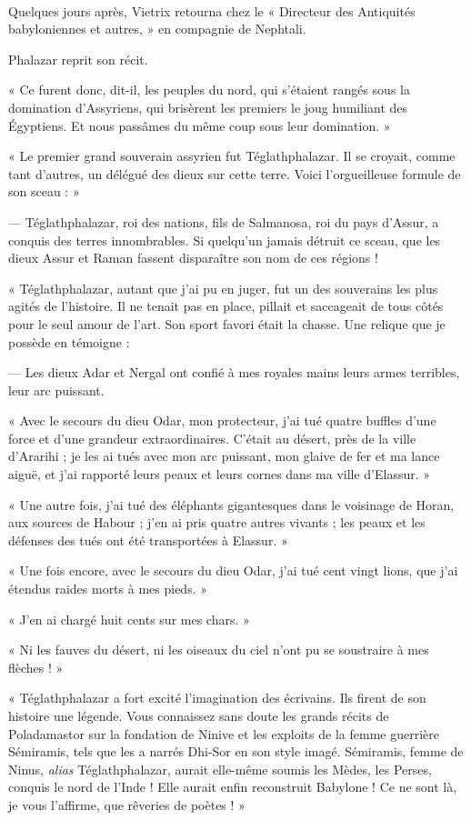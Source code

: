 \documentclass[a4paper, 11pt, oneside, polutonikogreek, french]{article}
\begin{document}
\paragraph{}
Quelques jours après, Vietrix retourna chez le « Directeur des Antiquités babyloniennes et autres, » en compagnie de Nephtali.

Phalazar reprit son récit.

« Ce furent donc, dit-il, les peuples du nord, qui s'étaient rangés sous la domination d'Assyriens, qui brisèrent les premiers le joug humiliant des Égyptiens. Et nous passâmes du même coup sous leur domination. »

« Le premier grand souverain assyrien fut Téglathphalazar. Il se croyait, comme tant d'autres, un délégué des dieux sur cette terre. Voici l'orgueilleuse formule de son sceau : »

--- Téglathphalazar, roi des nations, fils de Salmanosa, roi du pays d'Assur, a conquis des terres innombrables. Si quelqu'un jamais détruit ce sceau, que les dieux Assur et Raman fassent disparaître son nom de ces régions !

« Téglathphalazar, autant que j'ai pu en juger, fut un des souverains les plus agités de l'histoire. Il ne tenait pas en place, pillait et saccageait de tous côtés pour le seul amour de l'art. Son sport favori était la chasse. Une relique que je possède en témoigne :

--- Les dieux Adar et Nergal ont confié à mes royales mains leurs armes terribles, leur arc puissant.

« Avec le secours du dieu Odar, mon protecteur, j'ai tué quatre buffles d'une force et d'une grandeur extraordinaires. C'était au désert, près de la ville d'Ararihi ; je les ai tués avec mon arc puissant, mon glaive de fer et ma lance aiguë, et j'ai rapporté leurs peaux et leurs cornes dans ma ville d'Elassur. »

« Une autre fois, j'ai tué des éléphants gigantesques dans le voisinage de Horan, aux sources de Habour ; j'en ai pris quatre autres vivants ; les peaux et les défenses des tués ont été transportées à Elassur. »

« Une fois encore, avec le secours du dieu Odar, j'ai tué cent vingt lions, que j'ai étendus raides morts à mes pieds. »

« J'en ai chargé huit cents sur mes chars. »

« Ni les fauves du désert, ni les oiseaux du ciel n'ont pu se soustraire à mes flèches ! »

« Téglathphalazar a fort excité l'imagination des écrivains. Ils firent de son histoire une légende. Vous connaissez sans doute les grands récits de Poladamastor sur la fondation de Ninive et les exploits de la femme guerrière Sémiramis, tels que les a narrés Dhi-Sor en son style imagé. Sémiramis, femme de Ninus, \emph{alias} Téglathphalazar, aurait elle-même soumis les Mèdes, les Perses, conquis le nord de l'Inde ! Elle aurait enfin reconstruit Babylone ! Ce ne sont là, je vous l'affirme, que rêveries de poètes ! »
\end{document}

